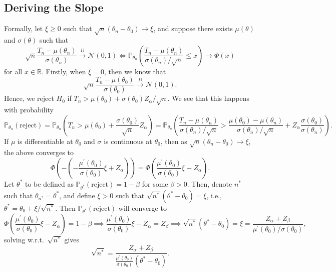 \subsection{Deriving the Slope}
Formally, let \(\xi \geq 0\) such that \(\sqrt{n} (\theta _n - \theta _0) \to \xi \), and suppose there exists \(\mu (\theta )\) and \(\sigma (\theta )\) such that
\[
	\sqrt{n} \frac{T_n - \mu (\theta _n)}{\sigma (\theta _n)}
	\overset{D}{\to} \mathcal{N} (0, 1)
	\iff
	\mathbb{P} _{\theta _n} \left( \frac{T_n - \mu (\theta _n)}{\sigma (\theta _n) / \sqrt{n} } \leq x \right)
	\to \Phi (x)
\]
for all \(x \in \mathbb{R} \). Firstly, when \(\xi = 0\), then we know that
\[
	\sqrt{n} \frac{T_n - \mu (\theta _0)}{\sigma (\theta _0)}
	\overset{D}{\to} \mathcal{N} (0, 1).
\]
Hence, we reject \(H_0\) if \(T_n > \mu (\theta _0) + \sigma (\theta _0) Z_\alpha / \sqrt{n} \). We see that this happens with probability
\[
	\mathbb{P} _{\theta _n}(\text{reject} )
	= \mathbb{P} _{\theta _n} \left( T_n > \mu (\theta _0) + \frac{\sigma (\theta _0)}{\sqrt{n} } Z_\alpha \right)
	= \mathbb{P} _{\theta _n} \left( \frac{T_n - \mu (\theta _n)}{\sigma (\theta _n) / \sqrt{n} } > \frac{\mu (\theta _0) - \mu (\theta _n)}{\sigma (\theta _n) / \sqrt{n} } + Z_\alpha \frac{\sigma (\theta _0)}{\sigma (\theta _n)} \right).
\]
If \(\mu \) is differentiable at \(\theta _0\) and \(\sigma \) is continuous at \(\theta _0\), then as \(\sqrt{n} (\theta _n - \theta _0) \to \xi\), the above converges to
\[
	\Phi \left( - \left( - \frac{\mu ^{\prime} (\theta _0)}{\sigma (\theta _0)}\xi + Z_\alpha \right) \right)
	= \Phi \left( \frac{\mu ^{\prime} (\theta _0)}{\sigma (\theta _0)}\xi - Z_\alpha \right).
\]
Let \(\theta ^{\ast} \) to be defined as \(\mathbb{P} _{\theta ^{\ast} }(\text{reject} ) = 1 - \beta \) for some \(\beta > 0\). Then, denote \(n^{\ast} \) such that \(\theta _{n^{\ast} } = \theta ^{\ast} \), and define \(\xi > 0\) such that \(\sqrt{n^{\ast} } (\theta ^{\ast} - \theta _0) = \xi\), i.e., \(\theta ^{\ast} = \theta _0 + \xi / \sqrt{n^{\ast} } \). Then \(\mathbb{P} _{\theta ^{\ast} }(\text{reject} )\) will converge to
\[
	\Phi \left( \frac{\mu ^{\prime} (\theta _0)}{\sigma (\theta _0)}\xi - Z_\alpha \right)
	= 1 - \beta
	\implies \frac{\mu ^{\prime} (\theta _0)}{\sigma (\theta _0)}\xi - Z_\alpha
	= Z_\beta
	\implies \sqrt{n^{\ast} }(\theta ^{\ast} - \theta _0)
	= \xi = \frac{Z_\alpha + Z_\beta }{\mu ^{\prime} (\theta _0) / \sigma (\theta _0)},
\]
solving w.r.t.\ \(\sqrt{n^{\ast} } \) gives
\[
	\sqrt{n^{\ast} }
	= \frac{Z_\alpha + Z_\beta }{\frac{\mu ^{\prime} (\theta _0)}{\sigma (\theta _0)} (\theta ^{\ast} - \theta _0)}.
\]

